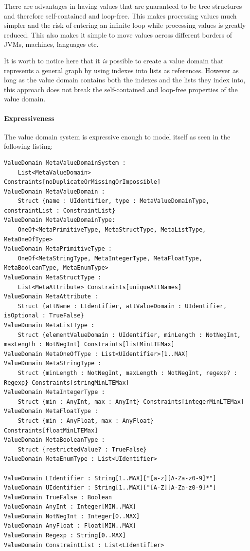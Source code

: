 There are advantages in having values that are guaranteed to be tree
structures and therefore self-contained and loop-free. This makes
processing values much simpler and the risk of entering an infinite
loop while processing values is greatly reduced. This also makes it
simple to move values across different borders of JVMs, machines,
languages etc.

It is worth to notice here that it \emph{is} possible to create a
value domain that represents a general graph by using indexes into
lists as references. However as long as the value domain contains
both the indexes and the lists they index into, this approach does
not break the self-contained and loop-free properties of the value
domain.


\paragraph{Expressiveness}

The value domain system is expressive enough to model itself as seen
in the following listing:

\begin{lstlisting}[basicstyle={\tiny},breaklines=true,tabsize=2]
ValueDomain MetaValueDomainSystem :
	List<MetaValueDomain> Constraints[noDuplicateOrMissingOrImpossible]
ValueDomain MetaValueDomain :
	Struct {name : UIdentifier, type : MetaValueDomainType, constraintList : ConstraintList}
ValueDomain MetaValueDomainType:
	OneOf<MetaPrimitiveType, MetaStructType, MetaListType, MetaOneOfType>
ValueDomain MetaPrimitiveType :
	OneOf<MetaStringType, MetaIntegerType, MetaFloatType, MetaBooleanType, MetaEnumType>
ValueDomain MetaStructType :
	List<MetaAttribute> Constraints[uniqueAttNames]
ValueDomain MetaAttribute :
	Struct {attName : LIdentifier, attValueDomain : UIdentifier, isOptional : TrueFalse}
ValueDomain MetaListType :
	Struct {elementValueDomain : UIdentifier, minLength : NotNegInt, maxLength : NotNegInt} Constraints[listMinLTEMax]
ValueDomain MetaOneOfType : List<UIdentifier>[1..MAX]
ValueDomain MetaStringType :
	Struct {minLength : NotNegInt, maxLength : NotNegInt, regexp? : Regexp} Constraints[stringMinLTEMax]
ValueDomain MetaIntegerType :
	Struct {min : AnyInt, max : AnyInt} Constraints[integerMinLTEMax]
ValueDomain MetaFloatType :
	Struct {min : AnyFloat, max : AnyFloat} Constraints[floatMinLTEMax]
ValueDomain MetaBooleanType :
	Struct {restrictedValue? : TrueFalse}
ValueDomain MetaEnumType : List<UIdentifier>

ValueDomain LIdentifier : String[1..MAX]["[a-z][A-Za-z0-9]*"]
ValueDomain UIdentifier : String[1..MAX]["[A-Z][A-Za-z0-9]*"]
ValueDomain TrueFalse : Boolean
ValueDomain AnyInt : Integer[MIN..MAX]
ValueDomain NotNegInt : Integer[0..MAX]
ValueDomain AnyFloat : Float[MIN..MAX]
ValueDomain Regexp : String[0..MAX]
ValueDomain ConstraintList : List<LIdentifier>
\end{lstlisting}



